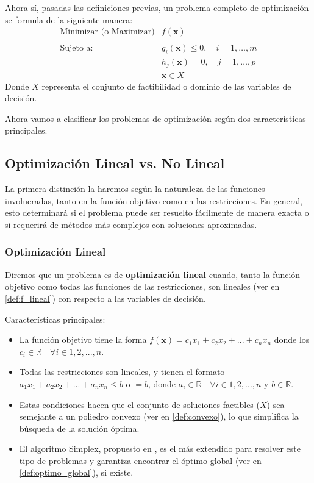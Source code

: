 \documentclass[12pt,a4paper]{book}
\begin{document}
Ahora sí, pasadas las definiciones previas, un problema completo de optimización se formula de la siguiente manera:
$$
\begin{array}{ll}
\text{Minimizar (o Maximizar)} & f(\mathbf{x}) \\ \\
\text{Sujeto a:} & g_i(\mathbf{x}) \le 0, \quad i = 1, \ldots, m \\
& h_j(\mathbf{x}) = 0, \quad j = 1, \ldots, p \\
& \mathbf{x} \in X
\end{array}
$$
Donde $X$ representa el conjunto de factibilidad o dominio de las variables de decisión.

Ahora vamos a clasificar los problemas de optimización según dos características principales.

\subsection{Optimización Lineal vs. No Lineal}

La primera distinción la haremos según la naturaleza de las funciones involucradas, tanto en la función objetivo como en las restricciones. En general, esto determinará si el problema puede ser resuelto fácilmente de manera exacta o si requerirá de métodos más complejos con soluciones aproximadas.

\subsubsection{Optimización Lineal}
Diremos que un problema es de \textbf{optimización lineal} cuando, tanto la función objetivo como todas las funciones de las restricciones, son lineales (ver en \ref{def:f_lineal}) con respecto a las variables de decisión. 

Características principales:
\begin{itemize}
    \item La función objetivo tiene la forma $f(\mathbf{x})=c_1x_1+c_2x_2+...+c_nx_n$ donde los $c_i \in \mathbb{R} \quad \forall i \in 1,2,...,n$.
    \item Todas las restricciones son lineales, y tienen el formato $a_1x_1+a_2x_2+...+a_nx_n\leq b$ o $=b$, donde $a_i \in \mathbb{R} \quad \forall i \in 1,2,...,n$ y $b\in \mathbb{R}$.
    \item Estas condiciones hacen que el conjunto de soluciones factibles ($X$) sea semejante a un poliedro convexo (ver en \ref{def:convexo}), lo que simplifica la búsqueda de la solución óptima.
    \item El algoritmo Simplex, propuesto en \cite{Dantzig1951}, es el más extendido para resolver este tipo de problemas y garantiza encontrar el óptimo global (ver en \ref{def:optimo_global}), si existe.
\end{itemize}
\end{document}
